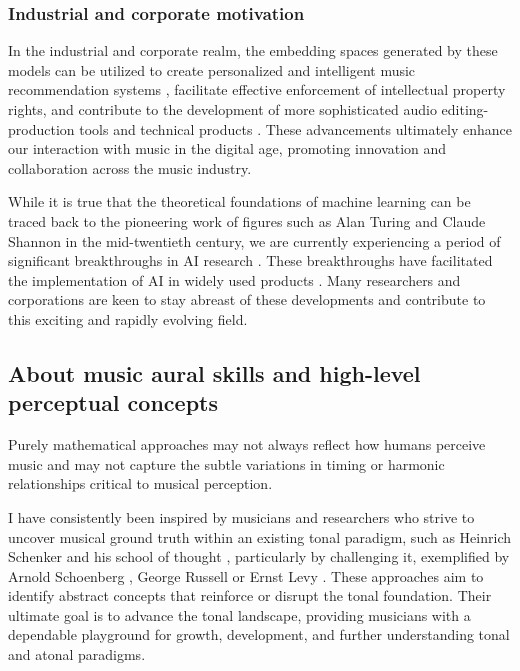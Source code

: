 \subsubsection{Industrial and corporate motivation}

In the industrial and corporate realm, the embedding spaces generated by these models can be utilized to create personalized and intelligent music recommendation systems \cite{Chen2020LearningRecommendation}\cite{epidemic}, facilitate effective enforcement of intellectual property rights, and contribute to the development of more sophisticated audio editing-production tools and technical products \cite{WonEmotionStories}. These advancements ultimately enhance our interaction with music in the digital age, promoting innovation and collaboration across the music industry.

While it is true that the theoretical foundations of machine learning can be traced back to the pioneering work of figures such as Alan Turing and Claude Shannon in the mid-twentieth century, we are currently experiencing a period of significant breakthroughs in AI research \cite{Vaswani2017AttentionNeed}. These breakthroughs have facilitated the implementation of AI in widely used products \cite{OpenAI2023GPT-4Report}. Many researchers and corporations are keen to stay abreast of these developments and contribute to this exciting and rapidly evolving field.

\subsection{About music aural skills and high-level perceptual concepts}

Purely mathematical approaches may not always reflect how humans perceive music and may not capture the subtle variations in timing or harmonic relationships critical to musical perception. 

I have consistently been inspired by musicians and researchers who strive to uncover musical ground truth within an existing tonal paradigm, such as Heinrich Schenker and his school of thought \cite{Komar1959SchenkersStructure}, particularly by challenging it, exemplified by Arnold Schoenberg \cite{Samson1974SchoenbergsMusic}, George Russell \cite{LydianRussell} or Ernst Levy \cite{LevyAHarmony}. These approaches aim to identify abstract concepts that reinforce or disrupt the tonal foundation. Their ultimate goal is to advance the tonal landscape, providing musicians with a dependable playground for growth, development, and further understanding tonal and atonal paradigms.

